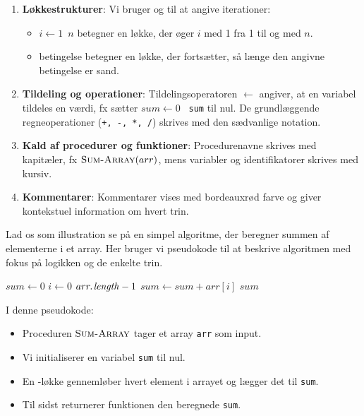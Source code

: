 \begin{enumerate}
    \item \textbf{Løkkestrukturer}: Vi bruger \texttt{\For} og \texttt{\While} til at angive iterationer:
    \begin{itemize}
        \item \texttt{\For $i \gets 1$ \To $n$} betegner en løkke, der øger \( i \) med 1 fra 1 til og med \( n \).
        \item \texttt{\While} betingelse betegner en løkke, der fortsætter, så længe den angivne betingelse er sand.
    \end{itemize}
    \item \textbf{Tildeling og operationer}: Tildelingsoperatoren $\gets$ angiver, at en variabel tildeles en værdi, fx sætter \texttt{$sum \gets 0$ } \texttt{sum} til nul. De grundlæggende regneoperationer (\texttt{+, -, *, /}) skrives med den sædvanlige notation.
    \item \textbf{Kald af procedurer og funktioner}: Procedurenavne skrives med kapitæler, fx \texttt{$\proc{Sum-Array}(arr)$}, mens variabler og identifikatorer skrives med kursiv.
    \item \textbf{Kommentarer}: Kommentarer vises med \textcolor{commentcolor}{bordeauxrød} farve og giver kontekstuel information om hvert trin.
\end{enumerate}

Lad os som illustration se på en simpel algoritme, der beregner summen af elementerne i et array. Her bruger vi pseudokode til at beskrive algoritmen med fokus på logikken og de enkelte trin.

\begin{codebox}
    \li $sum \gets 0$ 
    \li \For $i \gets 0$ \To $\attrib{arr}{length} - 1$ \Do
    \li     $sum \gets sum + arr[i]$ 
        \End
    \li \Return $sum$ 
\end{codebox}

I denne pseudokode:
\begin{itemize}
    \item Proceduren \texttt{$\proc{Sum-Array}$} tager et array \texttt{arr} som input.
    \item Vi initialiserer en variabel \texttt{sum} til nul.
    \item En \texttt{\For}-løkke gennemløber hvert element i arrayet og lægger det til \texttt{sum}.
    \item Til sidst returnerer funktionen den beregnede \texttt{sum}.
\end{itemize}

